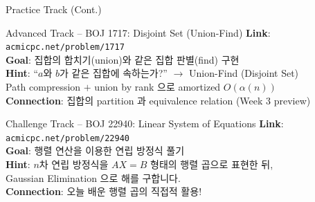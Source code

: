 \documentclass{beamer}
\begin{document}
\begin{frame}[t]{Practice Track (Cont.)}
    \small
    \vspace{0.2cm}

    \begin{block}{Advanced Track -- BOJ 1717: Disjoint Set (Union-Find)}
        \footnotesize
        \textbf{Link}: \texttt{acmicpc.net/problem/1717}\\[4pt]
        \textbf{Goal}: 집합의 합치기(union)와 같은 집합 판별(find) 구현\\[4pt]
        \textbf{Hint}: ``$a$와 $b$가 같은 집합에 속하는가?'' $\to$ Union-Find (Disjoint Set)\\
        Path compression $+$ union by rank 으로 amortized $O(\alpha(n))$\\[4pt]
        \textbf{Connection}: 집합의 partition 과 equivalence relation (Week 3 preview)
    \end{block}

    \vspace{0.15cm}
    \begin{alertblock}{Challenge Track -- BOJ 22940: Linear System of Equations}
        \footnotesize
        \textbf{Link}: \texttt{acmicpc.net/problem/22940}\\[4pt]
        \textbf{Goal}: 행렬 연산을 이용한 연립 방정식 풀기\\[4pt]
        \textbf{Hint}: $n$차 연립 방정식을 $AX = B$ 형태의 행렬 곱으로 표현한 뒤,\\
        Gaussian Elimination 으로 해를 구합니다.\\[4pt]
        \textbf{Connection}: 오늘 배운 행렬 곱의 직접적 활용!
    \end{alertblock}

    \vspace{0.15cm}
    
\end{frame}
\end{document}
